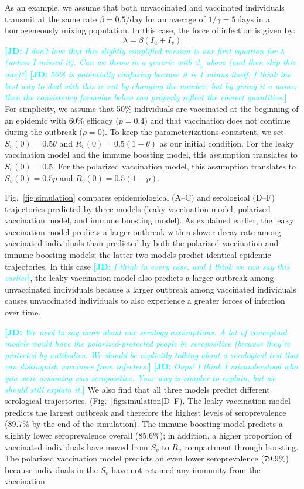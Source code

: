 \documentclass[12pt]{article}
\newcommand{\comment}{\showcomment}
\newcommand{\showcomment}[3]{\textcolor{#1}{\textbf{[#2: }\textsl{#3}\textbf{]}}}
\newcommand{\jd}[1]{\comment{cyan}{JD}{#1}}
\newcommand{\fref}[1]{Fig.~\ref{fig:#1}}
\begin{document}
As an example, we assume that both unvaccinated and vaccinated individuals transmit at the same rate $\beta=0.5/\mathrm{day}$ for an average of $1/\gamma=5~\mathrm{days}$ in a homogeneously mixing population. In this case, the force of infection is given by:
\begin{equation}
\lambda = \beta (I_u + I_v)
\end{equation}
\jd{I don't love that this slightly simplified version is our first equation for $\lambda$ (unless I missed it). Can we throw in a generic with $\beta_x$ above (and then skip this one)?}
\jd{50\% is potentially confusing because it is 1 minus itself. I think the best way to deal with this is not by changing the number, but by giving it a name; then the consistency formulae below can properly reflect the correct quantities.}
For simplicity, we assume that 50\% individuals are vaccinated at the beginning of an epidemic with 60\% efficacy ($p=0.4$) and that vaccination does not continue during the outbreak ($\rho = 0$).
To keep the parameterizations consistent, we set $S_v(0) = 0.5 \theta$ and $R_v(0) = 0.5 (1-\theta)$ as our initial condition.
For the leaky vaccination model and the immune boosting model, this assumption translates to $S_v(0) = 0.5$.
For the polarized vaccination model, this assumption translates to $S_v(0) = 0.5 p$ and $R_v(0) = 0.5 (1-p)$.

\fref{simulation} compares epidemiological (A--C) and serological (D--F) trajectories predicted by three models (leaky vaccination model, polarized vaccination model, and immune boosting model).
As explained earlier, the leaky vaccination model predicts a larger outbreak with a slower decay rate among vaccinated individuals than predicted by both the polarized vaccination and immune boosting models;
the latter two models predict identical epidemic trajectories.
In this case \jd{I think in every case, and I think we can say this earlier}, the leaky vaccination model also predicts a larger outbreak among unvaccinated individuals because a larger outbreak among vaccinated individuals causes unvaccinated individuals to also experience a greater forces of infection over time.

\jd{We need to say more about our serology assumptions. A lot of conceptual models would have the polarized-protected people be seropositive (because they're protected by antibodies. We should be explicitly talking about a serological test that can distinguish vaccinees from infectees.}
\jd{Oops! I think I misunderstood who you were assuming was seropositive. Your way is simpler to explain, but we should still explain it.}
We also find that all three models predict different serological trajectories. (\fref{simulation}D--F).
The leaky vaccination model predicts the largest outbreak and therefore the highest levels of seroprevalence (89.7\% by the end of the simulation).
The immune boosting model predicts a slightly lower seroprevalence overall (85.6\%);
in addition, a higher proportion of vaccinated individuals have moved from $S_v$ to $R_v$ compartment through boosting.
The polarized vaccination model predicts an even lower seroprevalence (79.9\%) because individuals in the $S_v$ have not retained any immunity from the vaccination.
\end{document}
